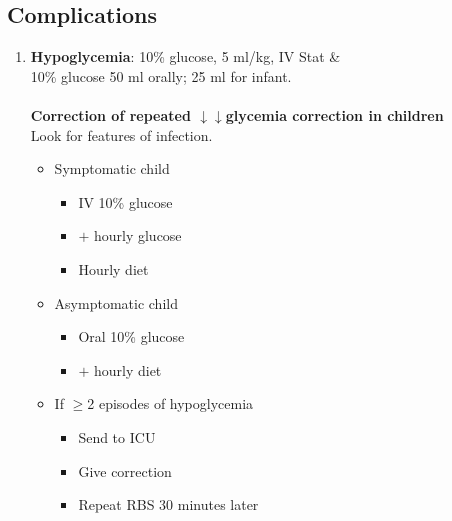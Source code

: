 \documentclass[11pt,a4paper]{report}
\begin{document}
\subsection{Complications}
\begin{enumerate}
	\item \textbf{Hypoglycemia}: 10\% glucose, 5 ml/kg, IV Stat \& \\ 10\% glucose 50 ml orally; 25 ml for infant.\\ \\
	\textbf{Correction of repeated $\downarrow\downarrow$glycemia correction in children} \\
	Look for features of infection. 
	\begin{itemize}
		\item Symptomatic child
		\begin{itemize}
			\item IV 10\% glucose 
			\item $+$ hourly glucose 
			\item Hourly diet
		\end{itemize}
		\item Asymptomatic child 
		\begin{itemize}
			\item Oral 10\% glucose 
			\item $+$ hourly diet
		\end{itemize}
		\item If $\geq$2 episodes of hypoglycemia
		\begin{itemize}
			\item Send to ICU
			\item Give correction
			\item Repeat RBS 30 minutes later
		\end{itemize}
	\end{itemize}
	

\end{enumerate}
\end{document}
